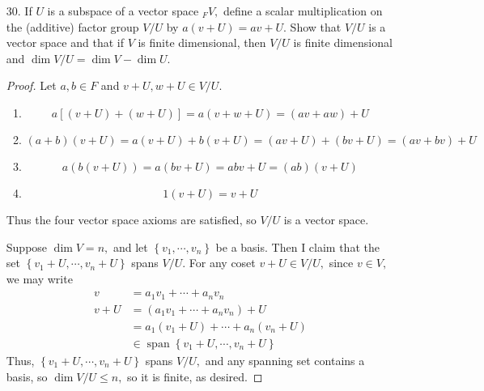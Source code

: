 \documentclass{article}
\DeclareMathOperator{\spn}{span}
\begin{document}
\begin{itemize}
\begin{enumerate}[(a)]
			\item Show that a spanning set $\left\{ v_1, \cdots, v_n \right\}$ of $_F V$ with $n$ minimal is a basis.
				\begin{proof}
					Suppose $\left\{ v_1, \cdots, v_n \right\}$ is not a basis. Then there exists a nontrivial linear combination
					\[a_1v_1+\cdots+a_nv_n=0\]
					WLOG $a_n\neq 0,$ so we have
					\begin{align*}
						v_n &= -a_n\inv a_1v_1 - \cdots - a_n\inv a_{n-1}v_{n-1}
					\end{align*}
					Thus, the set $\left\{ v_1, \cdots, v_{n-1} \right\}$ spans $V,$ which contradicts the minimality of $n.$ Thus, $\left\{ v_1, \cdots, v_n \right\}$ is a basis, as desired.
				\end{proof}
				
		\end{enumerate}

	\item[30.] If $U$ is a subspace of a vector space $_F V,$ define a scalar multiplication on the (additive) factor group $V/U$ by $a(v+U)=av+U.$ Show that $V/U$ is a vector space and that if $V$ is finite dimensional, then $V/U$ is finite dimensional and $\dim V/U=\dim V-\dim U.$
		\begin{proof} Let $a, b\in F$ and $v+U, w+U\in V/U.$
			\begin{enumerate}[V1]
				\item
					\[a\left[ (v+U)+(w+U) \right] = a(v+w+U) = (av+aw) + U\]
					
				\item 
					\[(a+b)(v+U) = a(v+U) + b(v+U) = (av+U)+(bv+U) = (av+bv) + U\]

				\item 
					\[a(b(v+U)) = a(bv + U) = abv + U = (ab)(v+U)\]

				\item
					\[1(v+U) = v+U\]
					
			\end{enumerate}
			Thus the four vector space axioms are satisfied, so $V/U$ is a vector space.

			Suppose $\dim V=n,$ and let $\left\{ v_1, \cdots, v_n \right\}$ be a basis. Then I claim that the set $\left\{ v_1+U, \cdots, v_n+U \right\}$ spans $V/U.$ For any coset $v+U\in V/U,$ since $v\in V,$ we may write
			\begin{align*}
				v &= a_1v_1+\cdots+a_nv_n \\
				v+U &= (a_1v_1+\cdots+a_nv_n) + U \\
				&= a_1(v_1+U) + \cdots + a_n(v_n+U) \\
				&\in \spn\left\{ v_1+U, \cdots, v_n+U \right\}
			\end{align*}
			Thus, $\left\{ v_1+U, \cdots, v_n+U \right\}$ spans $V/U,$ and any spanning set contains a basis, so $\dim V/U\le n,$ so it is finite, as desired.
		\end{proof}


\end{itemize}
\end{document}
